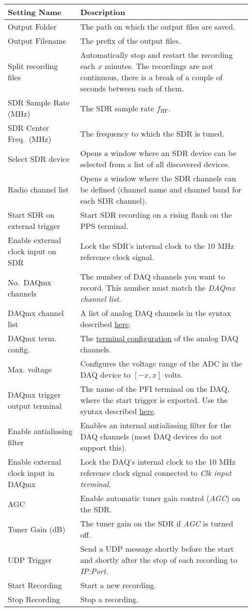 \documentclass[10pt]{article}
\begin{document}
\begin{tabular}{|l|p{15cm}|}
\hline
\textbf{Setting Name} & \textbf{Description} \\
\hline
Output Folder & The path on which the output files are saved. \\
Output Filename & The prefix of the output files. \\
Split recording files & Automatically stop and restart the recording each \(x\) minutes. The recordings are not continuous, there is a break of a couple of seconds between each of them. \\
SDR Sample Rate (MHz) & The SDR sample rate \(f_\text{HF}\). \\
SDR Center Freq.\ (MHz) & The frequency to which the SDR is tuned. \\
Select SDR device & Opens a window where an SDR device can be selected from a list of all discovered devices. \\
Radio channel list & Opens a window where the SDR channels can be defined (channel name and channel band for each SDR channel). \\
Start SDR on external trigger & Start SDR recording on a rising flank on the PPS terminal. \\
Enable external clock input on SDR & Lock the SDR's internal clock to the 10 MHz reference clock signal. \\
No.\ DAQmx channels & The number of DAQ channels you want to record. This number must match the \textit{DAQmx channel list}.\\
DAQmx channel list & A list of analog DAQ channels in the syntax described \href{http://zone.ni.com/reference/en-XX/help/370466AC-01/mxcncpts/physchannames/}{here}.  \\
DAQmx term. config. & The \href{http://zone.ni.com/reference/en-XX/help/370466AE-01/measfunds/connectaisigs/}{terminal configuration} of the analog DAQ channels. \\
Max. voltage & Configures the voltage range of the ADC in the DAQ device to \([-x,x]\) volts. \\
DAQmx trigger output terminal & The name of the PFI terminal on the DAQ, where the start trigger is exported. Use the syntax described  \href{http://zone.ni.com/reference/en-XX/help/370466AF-01/mxcncpts/termnamesyntax/}{here}. \\
Enable antialiasing filter & Enables an internal antialiasing filter for the DAQ channels (most DAQ devices do not support this). \\
Enable external clock input in DAQmx & Lock the DAQ's internal clock to the 10 MHz reference clock signal connected to \textit{Clk input terminal}. \\
AGC & Enable automatic tuner gain control (\textit{AGC}) on the SDR. \\
Tuner Gain (dB) & The tuner gain on the SDR if \textit{AGC} is turned off. \\
UDP Trigger & Send a UDP message shortly before the start and shortly after the stop of each recording to \textit{IP:Port}. \\
Start Recording & Start a new recording. \\
Stop Recording & Stop a recording. \\
\hline
\end{tabular}
\end{document}
